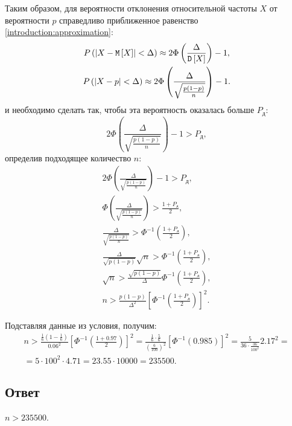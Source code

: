 Таким образом, для вероятности отклонения относительной частоты $X$ от вероятности $p$ справедливо приближенное равенство \eqref{introduction:approximation}:
\begin{gather}
    P \left ( \left | X - \mathtt{M} \left [ X \right ] \right | < \Delta \right ) \approx 2 \Phi \left ( \frac{\Delta}{\mathtt{D} \left [ X \right ]} \right ) - 1 , \\
    P \left ( \left | X - p \right | < \Delta \right ) \approx 2 \Phi \left ( \frac{\Delta}{\sqrt{\frac{p(1-p)}{n}}} \right ) - 1 .
\end{gather}
и необходимо сделать так, чтобы эта вероятность оказалась больше $P_\text{д}$:
\begin{equation}
    2 \Phi \left ( \frac{\Delta}{\sqrt{\frac{p(1-p)}{n}}} \right ) - 1 > P_\text{д} ,
\end{equation}
определив подходящее количество $n$:
\begin{gather}
    2 \Phi \left ( \frac{\Delta}{\sqrt{\frac{p(1-p)}{n}}} \right ) - 1 > P_\text{д} , \\
    \Phi \left ( \frac{\Delta}{\sqrt{\frac{p(1-p)}{n}}} \right ) > \frac{1 + P_\text{д}}{2} , \\
    \frac{\Delta}{\sqrt{\frac{p(1-p)}{n}}} > \Phi^{-1} \left ( \frac{1 + P_\text{д}}{2} \right ) , \\
    \frac{\Delta}{\sqrt{p(1-p)}} \sqrt{n} > \Phi^{-1} \left ( \frac{1 + P_\text{д}}{2} \right ) , \\
    \sqrt{n} > \frac{\sqrt{p(1-p)}}{\Delta} \Phi^{-1} \left ( \frac{1 + P_\text{д}}{2} \right ) , \\
    n > \frac{p(1-p)}{\Delta^2} \left [ \Phi^{-1} \left ( \frac{1 + P_\text{д}}{2} \right ) \right ]^2 .
\end{gather}

Подставляя данные из условия, получим:
\begin{multline}
    n >
    \frac{\frac{1}{6} \left ( 1 - \frac{1}{6} \right )}{0.06^2} \left [ \Phi^{-1} \left ( \frac{1 + 0.97}{2} \right ) \right ]^2
    = \frac{\frac{1}{6} \cdot \frac{5}{6}}{\left ( \frac{6}{100} \right )^2} \left [ \Phi^{-1} \left ( 0.985 \right ) \right ]^2
    = \frac{5}{36 \cdot \frac{36}{100^2}} 2.17^2 = \\
    = 5 \cdot 100^2 \cdot 4.71
    = 23.55 \cdot 10000
    = 235500 .
\end{multline}
\subsection*{Ответ}
$n > 235500$.

